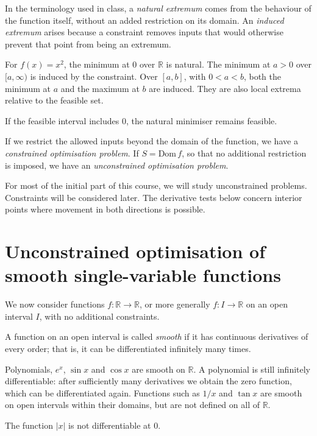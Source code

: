 In the terminology used in class, a \emph{natural extremum} comes from the behaviour of the function itself, without an added restriction on its domain. An \emph{induced extremum} arises because a constraint removes inputs that would otherwise prevent that point from being an extremum.

For $f(x)=x^2$, the minimum at $0$ over $\mathbb{R}$ is natural. The minimum at $a>0$ over $[a,\infty)$ is induced by the constraint. Over $[a,b]$, with $0<a<b$, both the minimum at $a$ and the maximum at $b$ are induced. They are also local extrema relative to the feasible set.

If the feasible interval includes $0$, the natural minimiser remains feasible.

\begin{definition}
	If we restrict the allowed inputs beyond the domain of the function, we have a \emph{constrained optimisation problem}. If $S=\mathrm{Dom}\,f$, so that no additional restriction is imposed, we have an \emph{unconstrained optimisation problem}.
\end{definition}

For most of the initial part of this course, we will study unconstrained problems. Constraints will be considered later. The derivative tests below concern interior points where movement in both directions is possible.

\section{Unconstrained optimisation of smooth single-variable functions}

We now consider functions $f:\mathbb{R}\to\mathbb{R}$, or more generally $f:I\to\mathbb{R}$ on an open interval $I$, with no additional constraints.

\begin{definition}
	A function on an open interval is called \emph{smooth} if it has continuous derivatives of every order; that is, it can be differentiated infinitely many times.
\end{definition}

\begin{example}
	Polynomials, $e^x$, $\sin x$ and $\cos x$ are smooth on $\mathbb{R}$. A polynomial is still infinitely differentiable: after sufficiently many derivatives we obtain the zero function, which can be differentiated again. Functions such as $1/x$ and $\tan x$ are smooth on open intervals within their domains, but are not defined on all of $\mathbb{R}$.
\end{example}
\begin{nonexample}
	The function $|x|$ is not differentiable at $0$.
\end{nonexample}

